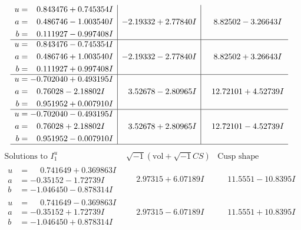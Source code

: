 \documentclass[1p]{elsarticle_modified}
\theoremstyle{definition}
\newcommand{\I}{\sqrt{-1}}
\begin{document}
$$\begin{array}{c|c|c}
\begin{aligned}
u &= \phantom{-}0.843476 + 0.745354 I \\
a &= \phantom{-}0.486746 - 1.003540 I \\
b &= \phantom{-}0.111927 - 0.997408 I\end{aligned}
 & -2.19332 + 2.77840 I & \phantom{-}8.82502 - 3.26643 I \\ \hline\begin{aligned}
u &= \phantom{-}0.843476 - 0.745354 I \\
a &= \phantom{-}0.486746 + 1.003540 I \\
b &= \phantom{-}0.111927 + 0.997408 I\end{aligned}
 & -2.19332 - 2.77840 I & \phantom{-}8.82502 + 3.26643 I \\ \hline\begin{aligned}
u &= -0.702040 + 0.493195 I \\
a &= \phantom{-}0.76028 - 2.18802 I \\
b &= \phantom{-}0.951952 + 0.007910 I\end{aligned}
 & \phantom{-}3.52678 - 2.80965 I & \phantom{-}12.72101 + 4.52739 I \\ \hline\begin{aligned}
u &= -0.702040 - 0.493195 I \\
a &= \phantom{-}0.76028 + 2.18802 I \\
b &= \phantom{-}0.951952 - 0.007910 I\end{aligned}
 & \phantom{-}3.52678 + 2.80965 I & \phantom{-}12.72101 - 4.52739 I\\
 \hline 
 \end{array}$$\newpage$$\begin{array}{c|c|c}  
\text{Solutions to }I^u_{1}& \I (\text{vol} + \sqrt{-1}CS) & \text{Cusp shape}\\
 \hline 
\begin{aligned}
u &= \phantom{-}0.741649 + 0.369863 I \\
a &= -0.35152 - 1.72739 I \\
b &= -1.046450 - 0.878314 I\end{aligned}
 & \phantom{-}2.97315 + 6.07189 I & \phantom{-}11.5551 - 10.8395 I \\ \hline\begin{aligned}
u &= \phantom{-}0.741649 - 0.369863 I \\
a &= -0.35152 + 1.72739 I \\
b &= -1.046450 + 0.878314 I\end{aligned}
 & \phantom{-}2.97315 - 6.07189 I & \phantom{-}11.5551 + 10.8395 I \\ \hline\begin{aligned}

\end{aligned}
\end{array}$$
\end{document}
